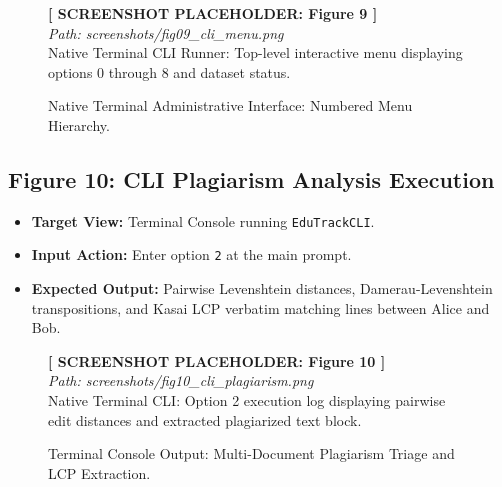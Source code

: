 \begin{figure}[H]
\centering
\begin{tcolorbox}[colback=white,colframe=codegray,width=0.92\textwidth,halign=center]
\vspace{0.8cm}
\textbf{[ SCREENSHOT PLACEHOLDER: Figure 9 ]}\\
\textit{Path: screenshots/fig09_cli_menu.png}\\
\small Native Terminal CLI Runner: Top-level interactive menu displaying options 0 through 8 and dataset status.
\vspace{0.8cm}
\end{tcolorbox}
\caption{Native Terminal Administrative Interface: Numbered Menu Hierarchy.}
\label{fig:ss_cli_menu}
\end{figure}

\subsection{Figure 10: CLI Plagiarism Analysis Execution}
\begin{itemize}
    \item \textbf{Target View:} Terminal Console running \texttt{EduTrackCLI}.
    \item \textbf{Input Action:} Enter option \texttt{2} at the main prompt.
    \item \textbf{Expected Output:} Pairwise Levenshtein distances, Damerau-Levenshtein transpositions, and Kasai LCP verbatim matching lines between Alice and Bob.
\end{itemize}

\begin{figure}[H]
\centering
\begin{tcolorbox}[colback=white,colframe=codegray,width=0.92\textwidth,halign=center]
\vspace{0.8cm}
\textbf{[ SCREENSHOT PLACEHOLDER: Figure 10 ]}\\
\textit{Path: screenshots/fig10_cli_plagiarism.png}\\
\small Native Terminal CLI: Option 2 execution log displaying pairwise edit distances and extracted plagiarized text block.
\vspace{0.8cm}
\end{tcolorbox}
\caption{Terminal Console Output: Multi-Document Plagiarism Triage and LCP Extraction.}
\label{fig:ss_cli_plagiarism}
\end{figure}

